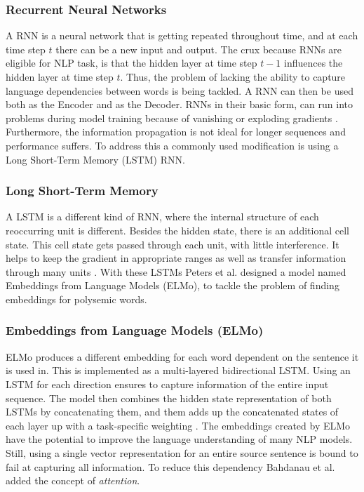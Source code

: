 \documentclass[11pt, a4paper]{amsart}
\begin{document}
\subsubsection{Recurrent Neural Networks}
A RNN is a neural network that is getting repeated throughout time, and at each time step $t$ there can be a new input and output. The crux because RNNs are eligible for NLP task, is that the hidden layer at time step $t-1$ influences the hidden layer at time step $t$. Thus, the problem of lacking the ability to capture language dependencies between words is being tackled. A RNN can then be used both as the Encoder and as the Decoder. RNNs in their basic form, can run into problems during model training because of vanishing or exploding gradients  \cite{sutskever2014sequence}. Furthermore, the information propagation is not ideal for longer sequences and performance suffers. To address this a commonly used modification is using a Long Short-Term Memory (LSTM) RNN. 

\subsubsection{Long Short-Term Memory}
A LSTM is a different kind of RNN, where the internal structure of each reoccurring unit is different. Besides the hidden state, there is an additional cell state. This cell state gets passed through each unit, with little interference. It helps to keep the gradient in appropriate ranges as well as transfer information through many units \cite{karpathyRNN}. With these LSTMs Peters et al. designed a model named Embeddings from Language Models (ELMo), to tackle the problem of finding embeddings for polysemic words.

\subsubsection{Embeddings from Language Models (ELMo)}
ELMo produces a different embedding for each word dependent on the sentence it is used in. This is implemented as a multi-layered bidirectional LSTM. Using an LSTM for each direction ensures to capture information of the entire input sequence. The model then combines the hidden state representation of both LSTMs by concatenating them, and them adds up the concatenated states of each layer up with a task-specific weighting \cite{DBLP:conf/naacl/PetersNIGCLZ18}.  The embeddings created by ELMo have the potential to improve the language understanding of many NLP models. Still, using a single vector representation for an entire source sentence is bound to fail at capturing all information. 
To reduce this dependency Bahdanau et al. added the concept of \emph{attention}.
\end{document}
